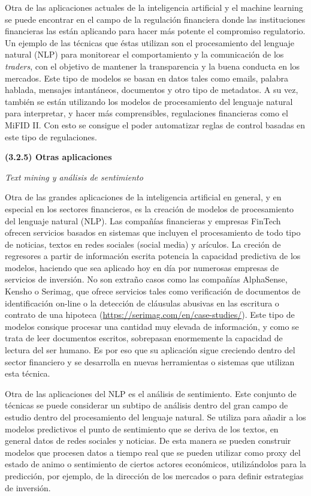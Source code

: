\documentclass[]{article}
\begin{document}
Otra de las aplicaciones actuales de la inteligencia artificial y el
machine learning se puede encontrar en el campo de la regulación
financiera donde las instituciones financieras las están aplicando para
hacer más potente el compromiso regulatorio. Un ejemplo de las técnicas
que éstas utilizan son el procesamiento del lenguaje natural (NLP) para
monitorear el comportamiento y la comunicación de los \emph{traders},
con el objetivo de mantener la transparencia y la buena conducta en los
mercados. Este tipo de modelos se basan en datos tales como emails,
palabra hablada, mensajes intantáneos, documentos y otro tipo de
metadatos. A su vez, también se están utilizando los modelos de
procesamiento del lenguaje natural para interpretar, y hacer más
comprensibles, regulaciones financieras como el MiFID II. Con esto se
consigue el poder automatizar reglas de control basadas en este tipo de
regulaciones.

\textbf{(3.2.5) Otras aplicaciones}

\emph{Text mining y análisis de sentimiento}

Otra de las grandes aplicaciones de la inteligencia artificial en
general, y en especial en los sectores financieros, es la creación de
modelos de procesamiento del lenguaje natural (NLP). Las compañías
financieras y empresas FinTech ofrecen servicios basados en sistemas que
incluyen el procesamiento de todo tipo de noticias, textos en redes
sociales (social media) y arículos. La creción de regresores a partir de
información escrita potencia la capacidad predictiva de los modelos,
haciendo que sea aplicado hoy en día por numerosas empresas de servicios
de inversión. No son extraño casos como las compañías AlphaSense, Kensho
o Serimag, que ofrece servicios tales como verificación de documentos de
identificación on-line o la detección de cláusulas abusivas en las
escritura o contrato de una hipoteca
(\url{https://serimag.com/en/case-studies/}). Este tipo de modelos
consique procesar una cantidad muy elevada de información, y como se
trata de leer documentos escritos, sobrepasan enormemente la capacidad
de lectura del ser humano. Es por eso que su aplicación sigue creciendo
dentro del sector financiero y se desarrolla en nuevas herramientas o
sistemas que utilizan esta técnica.

Otra de las aplicaciones del NLP es el análisis de sentimiento. Este
conjunto de técnicas se puede considerar un subtipo de análisis dentro
del gran campo de estudio dentro del procesamiento del lenguaje natural.
Se utiliza para añadir a los modelos predictivos el punto de sentimiento
que se deriva de los textos, en general datos de redes sociales y
noticias. De esta manera se pueden construir modelos que procesen datos
a tiempo real que se pueden utilizar como proxy del estado de animo o
sentimiento de ciertos actores económicos, utilizándolos para la
predicción, por ejemplo, de la dirección de los mercados o para definir
estrategias de inversión.
\end{document}

